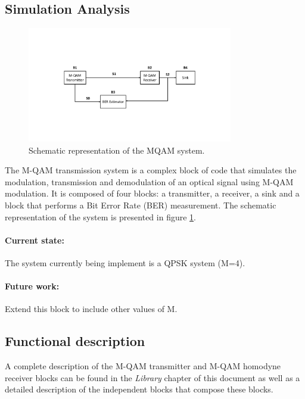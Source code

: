 \pagebreak
\subsection{Simulation Analysis}

\begin{figure}[h]
	\centering
	\includegraphics[width=0.8\textwidth]{./sdf/m_qam_system/figures/MQAM_system_block_diagram}
	\caption{Schematic representation of the MQAM system.}\label{MQAM_system_block_diagram}
\end{figure}

The M-QAM transmission system is a complex block of code that simulates the modulation, transmission and
demodulation of an optical signal using M-QAM modulation.
It is composed of four blocks: a transmitter, a receiver, a sink and a block that performs a Bit Error Rate (BER) measurement. The schematic representation of the
system is presented in figure \ref{MQAM_system_block_diagram}.

\paragraph{Current state:} The system currently being implement is a QPSK system (M=4).

\paragraph{Future work:} Extend this block to include other values of M.

\subsection*{Functional description}

A complete description of the M-QAM transmitter and M-QAM homodyne receiver blocks can be found in the \textit{Library} chapter of this document as well as a detailed description of the independent blocks that compose these blocks.


